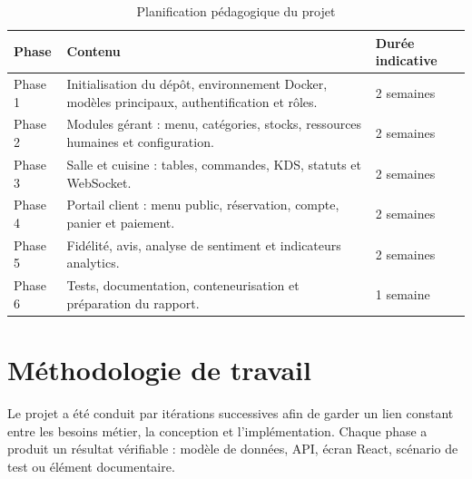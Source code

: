 \begin{table}[H]
\centering
\caption{Planification pédagogique du projet}
\label{tab:planification}
\begin{tabularx}{\textwidth}{p{2.2cm}Yp{2.4cm}}
\toprule
\textbf{Phase} & \textbf{Contenu} & \textbf{Durée indicative} \\
\midrule
Phase 1 & Initialisation du dépôt, environnement Docker, modèles principaux, authentification et rôles. & 2 semaines \\
Phase 2 & Modules gérant : menu, catégories, stocks, ressources humaines et configuration. & 2 semaines \\
Phase 3 & Salle et cuisine : tables, commandes, KDS, statuts et WebSocket. & 2 semaines \\
Phase 4 & Portail client : menu public, réservation, compte, panier et paiement. & 2 semaines \\
Phase 5 & Fidélité, avis, analyse de sentiment et indicateurs analytics. & 2 semaines \\
Phase 6 & Tests, documentation, conteneurisation et préparation du rapport. & 1 semaine \\
\bottomrule
\end{tabularx}
\end{table}

\section{Méthodologie de travail}
Le projet a été conduit par itérations successives afin de garder un lien constant entre les besoins métier, la conception et l'implémentation. Chaque phase a produit un résultat vérifiable : modèle de données, API, écran React, scénario de test ou élément documentaire.

